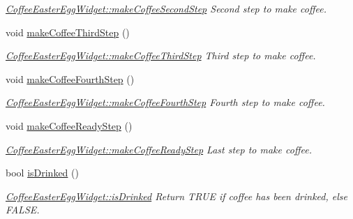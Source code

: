 \begin{DoxyCompactItemize}
\begin{DoxyCompactList}\small\item\em \hyperlink{classGui_1_1Widgets_1_1CoffeeEasterEggWidget_a9fd4dcc4291612f880c7d36a1cbd3c53}{Coffee\-Easter\-Egg\-Widget\-::make\-Coffee\-Second\-Step} Second step to make coffee. \end{DoxyCompactList}\item 
\hypertarget{classGui_1_1Widgets_1_1CoffeeEasterEggWidget_ab468afccbc650083b3f30382bc5f8645}{void \hyperlink{classGui_1_1Widgets_1_1CoffeeEasterEggWidget_ab468afccbc650083b3f30382bc5f8645}{make\-Coffee\-Third\-Step} ()}\label{classGui_1_1Widgets_1_1CoffeeEasterEggWidget_ab468afccbc650083b3f30382bc5f8645}

\begin{DoxyCompactList}\small\item\em \hyperlink{classGui_1_1Widgets_1_1CoffeeEasterEggWidget_ab468afccbc650083b3f30382bc5f8645}{Coffee\-Easter\-Egg\-Widget\-::make\-Coffee\-Third\-Step} Third step to make coffee. \end{DoxyCompactList}\item 
\hypertarget{classGui_1_1Widgets_1_1CoffeeEasterEggWidget_a57504081f4694b34c1e5f5f76fe7a6ae}{void \hyperlink{classGui_1_1Widgets_1_1CoffeeEasterEggWidget_a57504081f4694b34c1e5f5f76fe7a6ae}{make\-Coffee\-Fourth\-Step} ()}\label{classGui_1_1Widgets_1_1CoffeeEasterEggWidget_a57504081f4694b34c1e5f5f76fe7a6ae}

\begin{DoxyCompactList}\small\item\em \hyperlink{classGui_1_1Widgets_1_1CoffeeEasterEggWidget_a57504081f4694b34c1e5f5f76fe7a6ae}{Coffee\-Easter\-Egg\-Widget\-::make\-Coffee\-Fourth\-Step} Fourth step to make coffee. \end{DoxyCompactList}\item 
\hypertarget{classGui_1_1Widgets_1_1CoffeeEasterEggWidget_a85b1ce67ec9c50cf90dfff64a4a2f5d8}{void \hyperlink{classGui_1_1Widgets_1_1CoffeeEasterEggWidget_a85b1ce67ec9c50cf90dfff64a4a2f5d8}{make\-Coffee\-Ready\-Step} ()}\label{classGui_1_1Widgets_1_1CoffeeEasterEggWidget_a85b1ce67ec9c50cf90dfff64a4a2f5d8}

\begin{DoxyCompactList}\small\item\em \hyperlink{classGui_1_1Widgets_1_1CoffeeEasterEggWidget_a85b1ce67ec9c50cf90dfff64a4a2f5d8}{Coffee\-Easter\-Egg\-Widget\-::make\-Coffee\-Ready\-Step} Last step to make coffee. \end{DoxyCompactList}\item 
bool \hyperlink{classGui_1_1Widgets_1_1CoffeeEasterEggWidget_ad1442572de3c59eefec9928a4322130e}{is\-Drinked} ()
\begin{DoxyCompactList}\small\item\em \hyperlink{classGui_1_1Widgets_1_1CoffeeEasterEggWidget_ad1442572de3c59eefec9928a4322130e}{Coffee\-Easter\-Egg\-Widget\-::is\-Drinked} Return T\-R\-U\-E if coffee has been drinked, else F\-A\-L\-S\-E. \end{DoxyCompactList}\end{DoxyCompactItemize}


